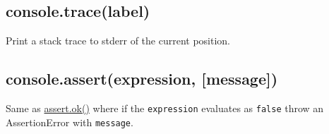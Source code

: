 \subsection{console.trace(label)}\label{console.tracelabel}

Print a stack trace to stderr of the current position.

\subsection{console.assert(expression,
{[}message{]})}\label{console.assertexpression-message}

Same as
\href{assert.html\#assert_assert_value_message_assert_ok_value_message}{assert.ok()}
where if the \texttt{expression} evaluates as \texttt{false} throw an
AssertionError with \texttt{message}.
